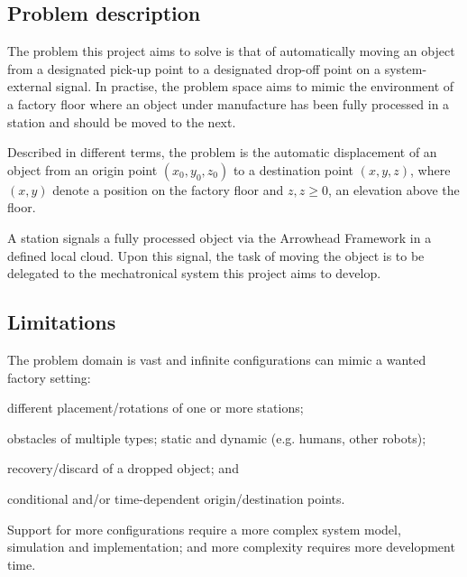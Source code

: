 \subsection{Problem description}
The problem this project aims to solve is that of automatically moving an object from a designated pick-up point to a designated drop-off point on a system-external signal.
In practise, the problem space aims to mimic the environment of a factory floor where an object under manufacture has been fully processed in a station and should be moved to the next.

Described in different terms, the problem is the automatic displacement of an object from an origin point $(x_0, y_0, z_0)$ to a destination point $(x, y, z)$,
where $(x, y)$ denote a position on the factory floor and $z, z \geq 0$, an elevation above the floor.

A station signals a fully processed object via the Arrowhead Framework in a defined local cloud.
Upon this signal, the task of moving the object is to be delegated to the mechatronical system this project aims to develop.


\subsection{Limitations}
The problem domain is vast and infinite configurations can mimic a wanted factory setting:
\begin{inline-enum}
    \item different placement/rotations of one or more stations;
    \item obstacles of multiple types; static and dynamic (e.g. humans, other robots);
    \item recovery/discard of a dropped object; and
    \item conditional and/or time-dependent origin/destination points.
\end{inline-enum}
Support for more configurations require a more complex system model, simulation and implementation;
and more complexity requires more development time.

